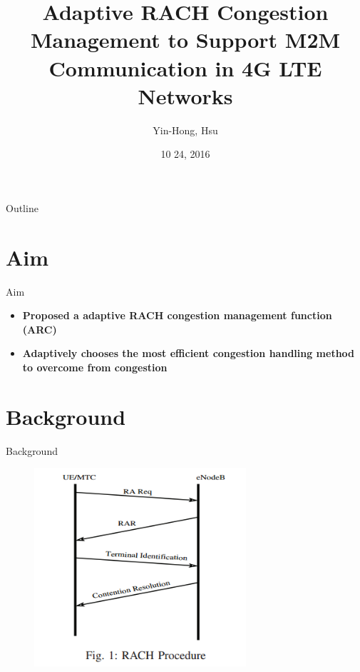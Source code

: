 \documentclass{beamer}
\title {
    Adaptive RACH Congestion Management to Support M2M Communication in 4G LTE Networks \cite{6802879}
}
\author {
    Yin-Hong, Hsu
}
\date {
    10 24, 2016
}
\begin{document}
\begin{frame}
    \titlepage
\end{frame}


\begin{frame}{Outline}
    \tableofcontentsgather
    \tableofcontents
\end{frame}

\section{Aim}

\begin{frame} {Aim} 
    \begin{itemize}
        \item \textbf{Proposed a adaptive RACH congestion management function (ARC)}
        \item \textbf{Adaptively chooses the most efficient congestion handling method to overcome from congestion}
    \end{itemize}
\end{frame}

\section{Background}

\begin{frame}{Background}
    \begin{figure}[t]
        \centering
        \includegraphics[width=0.7\textwidth]{figures/p1.png}
    \end{figure}
\end{frame}
\end{document}
